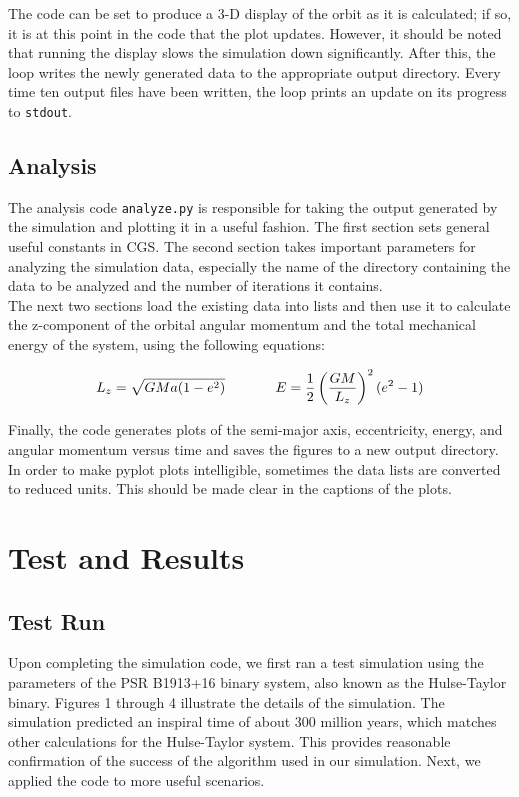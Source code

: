 \documentclass[11pt,letterpaper]{article}
\begin{document}
The code can be set to produce a 3-D display of the orbit as it is calculated; if so, it is at this point in the code that the plot updates. However, it should be noted that running the display slows the simulation down significantly. After this, the loop writes the newly generated data to the appropriate output directory. Every time ten output files have been written, the loop prints an update on its progress to \texttt{stdout}.

\subsection{Analysis}

The analysis code \texttt{analyze.py} is responsible for taking the output generated by the simulation and plotting it in a useful fashion. The first section sets general useful constants in CGS. The second section takes important parameters for analyzing the simulation data, especially the name of the directory containing the data to be analyzed and the number of iterations it contains. \\

The next two sections load the existing data into lists and then use it to calculate the z-component of the orbital angular momentum and the total mechanical energy of the system, using the following equations:

$$ L_z = \sqrt{GMa (1 - e^2)} \hspace*{.5in} E = \frac{1}{2} \left( \frac{GM}{L_z} \right)^2 (e^2 - 1) $$

Finally, the code generates plots of the semi-major axis, eccentricity, energy, and angular momentum versus time and saves the figures to a new output directory. In order to make pyplot plots intelligible, sometimes the data lists are converted to reduced units. This should be made clear in the captions of the plots.

\section{Test and Results}

\subsection{Test Run}

Upon completing the simulation code, we first ran a test simulation using the parameters of the PSR B1913+16 binary system, also known as the Hulse-Taylor binary. Figures 1 through 4 illustrate the details of the simulation. The simulation predicted an inspiral time of about 300 million years, which matches other calculations for the Hulse-Taylor system. This provides reasonable confirmation of the success of the algorithm used in our simulation. Next, we applied the code to more useful scenarios.
\end{document}
